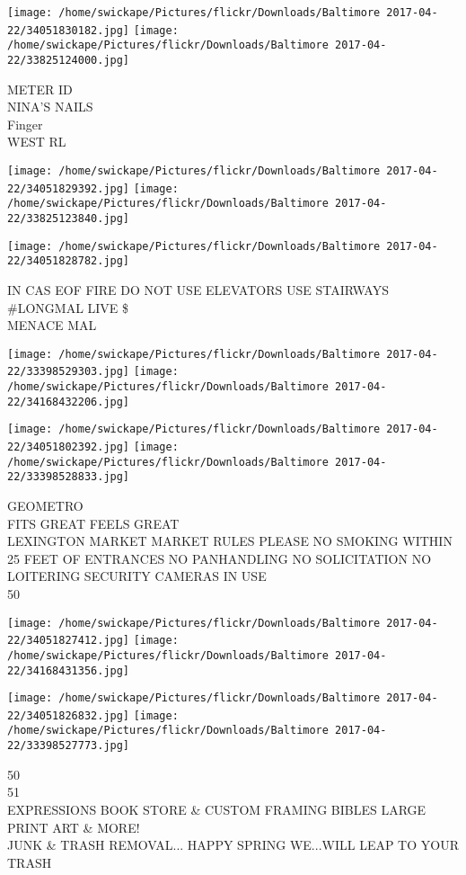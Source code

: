 \documentclass[10pt,letterpaper]{article}
\begin{document}
\texttt{[image: /home/swickape/Pictures/flickr/Downloads/Baltimore 2017-04-22/34051830182.jpg]}
\texttt{[image: /home/swickape/Pictures/flickr/Downloads/Baltimore 2017-04-22/33825124000.jpg]}

METER ID\\
NINA'S NAILS\\
Finger\\
WEST RL
\pagebreak

\texttt{[image: /home/swickape/Pictures/flickr/Downloads/Baltimore 2017-04-22/34051829392.jpg]}
\texttt{[image: /home/swickape/Pictures/flickr/Downloads/Baltimore 2017-04-22/33825123840.jpg]}

\vspace{0.25in}
\texttt{[image: /home/swickape/Pictures/flickr/Downloads/Baltimore 2017-04-22/34051828782.jpg]}

IN CAS EOF FIRE DO NOT USE ELEVATORS USE STAIRWAYS\\
\#LONGMAL LIVE \$\\
MENACE MAL
\pagebreak

\texttt{[image: /home/swickape/Pictures/flickr/Downloads/Baltimore 2017-04-22/33398529303.jpg]}
\texttt{[image: /home/swickape/Pictures/flickr/Downloads/Baltimore 2017-04-22/34168432206.jpg]}

\texttt{[image: /home/swickape/Pictures/flickr/Downloads/Baltimore 2017-04-22/34051802392.jpg]}
\texttt{[image: /home/swickape/Pictures/flickr/Downloads/Baltimore 2017-04-22/33398528833.jpg]}

GEOMETRO\\
FITS GREAT FEELS GREAT\\
LEXINGTON MARKET MARKET RULES PLEASE NO SMOKING WITHIN 25 FEET OF ENTRANCES NO PANHANDLING NO SOLICITATION NO LOITERING SECURITY CAMERAS IN USE\\
50
\pagebreak

\texttt{[image: /home/swickape/Pictures/flickr/Downloads/Baltimore 2017-04-22/34051827412.jpg]}
\texttt{[image: /home/swickape/Pictures/flickr/Downloads/Baltimore 2017-04-22/34168431356.jpg]}

\texttt{[image: /home/swickape/Pictures/flickr/Downloads/Baltimore 2017-04-22/34051826832.jpg]}
\texttt{[image: /home/swickape/Pictures/flickr/Downloads/Baltimore 2017-04-22/33398527773.jpg]}

50\\
51\\
EXPRESSIONS BOOK STORE \& CUSTOM FRAMING BIBLES LARGE PRINT ART \& MORE!\\
JUNK \& TRASH REMOVAL... HAPPY SPRING WE...WILL LEAP TO YOUR TRASH
\pagebreak
\end{document}

